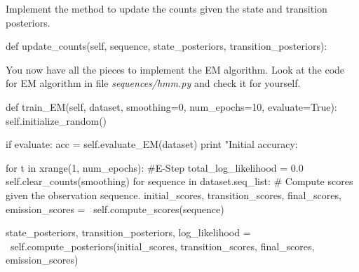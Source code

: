 \begin{exercise}

Implement the method to update the counts given the state and transition posteriors.
\begin{python}
 def update_counts(self, sequence, state_posteriors, transition_posteriors):
\end{python}




You now have all the pieces to implement the
EM algorithm. Look at the code for EM algorithm in file
\emph{sequences/hmm.py} and check it for yourself. 

\begin{python}
    def train_EM(self, dataset, smoothing=0, num_epochs=10, evaluate=True):
        self.initialize_random()

        if evaluate:
            acc = self.evaluate_EM(dataset)
            print "Initial accuracy: %
            
        for t in xrange(1, num_epochs):
            #E-Step
            total_log_likelihood = 0.0
            self.clear_counts(smoothing)
            for sequence in dataset.seq_list:
                # Compute scores given the observation sequence.
                initial_scores, transition_scores, final_scores, emission_scores = \
                    self.compute_scores(sequence)
                
                state_posteriors, transition_posteriors, log_likelihood = \
                    self.compute_posteriors(initial_scores,
                                            transition_scores,
                                            final_scores,
                                            emission_scores)


\end{python}
\end{exercise}
